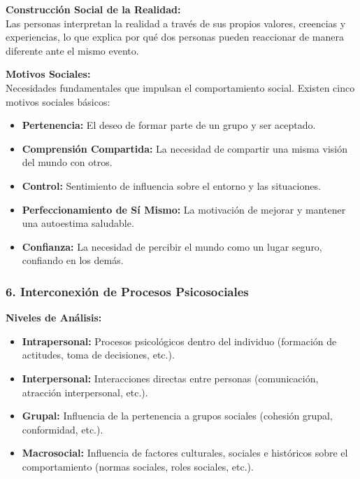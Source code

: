 \documentclass[
]{website}
\begin{document}
\textbf{Construcción Social de la Realidad:}\\
Las personas interpretan la realidad a través de sus propios valores, creencias y experiencias, lo que explica por qué dos personas pueden reaccionar de manera diferente ante el mismo evento.

\textbf{Motivos Sociales:}\\
Necesidades fundamentales que impulsan el comportamiento social. Existen cinco motivos sociales básicos:

\begin{itemize}
\item
  \textbf{Pertenencia:} El deseo de formar parte de un grupo y ser aceptado.
\item
  \textbf{Comprensión Compartida:} La necesidad de compartir una misma visión del mundo con otros.
\item
  \textbf{Control:} Sentimiento de influencia sobre el entorno y las situaciones.
\item
  \textbf{Perfeccionamiento de Sí Mismo:} La motivación de mejorar y mantener una autoestima saludable.
\item
  \textbf{Confianza:} La necesidad de percibir el mundo como un lugar seguro, confiando en los demás.
\end{itemize}

\subsubsection*{6. Interconexión de Procesos Psicosociales}\label{interconexiuxf3n-de-procesos-psicosociales}

\textbf{Niveles de Análisis:}

\begin{itemize}
\item
  \textbf{Intrapersonal:} Procesos psicológicos dentro del individuo (formación de actitudes, toma de decisiones, etc.).
\item
  \textbf{Interpersonal:} Interacciones directas entre personas (comunicación, atracción interpersonal, etc.).
\item
  \textbf{Grupal:} Influencia de la pertenencia a grupos sociales (cohesión grupal, conformidad, etc.).
\item
  \textbf{Macrosocial:} Influencia de factores culturales, sociales e históricos sobre el comportamiento (normas sociales, roles sociales, etc.).
\end{itemize}
\end{document}
